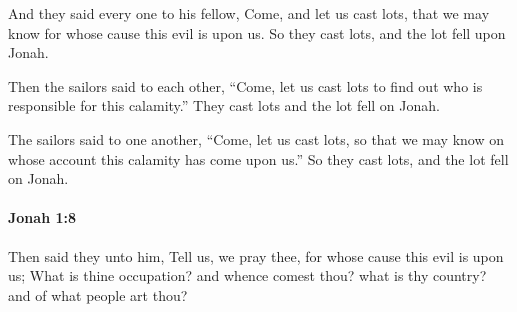 			\begin{versebox}
					\item[BHS] 
					\item[LXX] 
					\item[ASV] And they said every one to his fellow, Come, and let us cast lots, that we may know for whose cause this evil is upon us. So they cast lots, and the lot fell upon Jonah.
					\item[NIV] Then the sailors said to each other, “Come, let us cast lots to find out who is responsible for this calamity.” They cast lots and the lot fell on Jonah.
					\item[NRSV] The sailors said to one another, “Come, let us cast lots, so that we may know on whose account this calamity has come upon us.” So they cast lots, and the lot fell on Jonah.
			\end{versebox}

		\paragraph{Jonah 1:8} %
			\label{JONAH-1-8}

			Then said they unto him, Tell us, we pray thee, for whose cause this evil is upon us; What is thine occupation? and whence comest thou? what is thy country? and of what people art thou?

